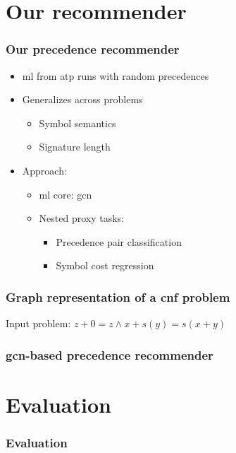 \documentclass[a4paper]{beamer}
\begin{document}
\section{Our recommender}

\begin{frame}
\frametitle{Our precedence recommender}
\begin{itemize}
\item \Acrlong{ml} from \gls{atp} runs with random precedences
\item Generalizes across problems
\begin{itemize}
\item Symbol semantics
\item Signature length
\end{itemize}
\item Approach:
\begin{itemize}
\item \Acrshort{ml} core: \Gls{gcn}
\item Nested proxy tasks:
\begin{itemize}
\item Precedence pair classification
\item Symbol cost regression
\end{itemize}
\end{itemize}
\end{itemize}
\end{frame}

\begin{frame}
\frametitle{Graph representation of a \acrshort{cnf} problem}

Input problem: $z + 0 = z \land x + s(y) = s(x + y)$

\centering

\end{frame}

\begin{frame}
\frametitle{\Acrshort{gcn}-based precedence recommender}
\centering

\end{frame}

\section{Evaluation}

\begin{frame}
\frametitle{Evaluation}

\fontsize{10pt}{12}\selectfont

\centering


\end{frame}
\end{document}
